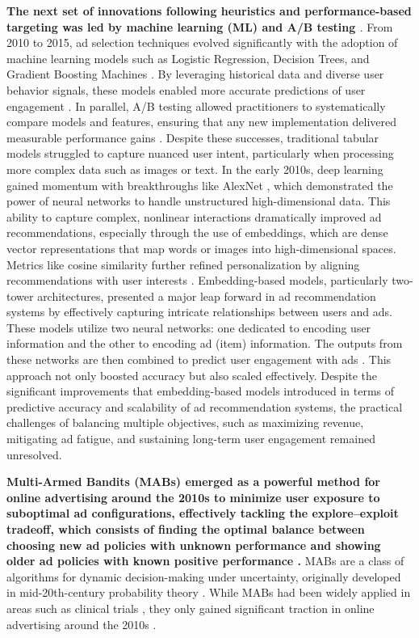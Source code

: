 \documentclass[final]{anthology-ch}         %
\begin{document}
\textbf{The next set of innovations following heuristics and performance-based targeting was led by machine learning (ML) and A/B testing \cite{barajas2022online}}. From 2010 to 2015, ad selection techniques evolved significantly with the adoption of machine learning models such as Logistic Regression, Decision Trees, and Gradient Boosting Machines \cite{cui2015global}. By leveraging historical data and diverse user behavior signals, these models enabled more accurate predictions of user engagement \cite{cui2015global}. In parallel, A/B testing allowed practitioners to systematically compare models and features, ensuring that any new implementation delivered measurable performance gains \cite{barajas2022online}.
Despite these successes, traditional tabular models struggled to capture nuanced user intent, particularly when processing more complex data such as images or text. In the early 2010s, deep learning gained momentum with breakthroughs like AlexNet \cite{krizhevsky2012imagenet}, which demonstrated the power of neural networks to handle unstructured high-dimensional data. This ability to capture complex, nonlinear interactions dramatically improved ad recommendations, especially through the use of embeddings, which are dense vector representations that map words or images into high-dimensional spaces. Metrics like cosine similarity further refined personalization by aligning recommendations with user interests \cite{covington2016deep}. Embedding-based models, particularly two-tower architectures, presented a major leap forward in ad recommendation systems by effectively capturing intricate relationships between users and ads. These models utilize two neural networks: one dedicated to encoding user information and the other to encoding ad (item) information. The outputs from these networks are then combined to predict user engagement with ads \cite{vorotilov2023scaling}. This approach not only boosted accuracy but also scaled effectively. Despite the significant improvements that embedding-based models introduced in terms of predictive accuracy and scalability of ad recommendation systems, the practical challenges of balancing multiple objectives, such as maximizing revenue, mitigating ad fatigue, and sustaining long-term user engagement remained unresolved.  


\textbf{Multi-Armed Bandits (MABs) emerged as a powerful method for online advertising around the 2010s to minimize user exposure to suboptimal ad configurations, effectively tackling the explore–exploit tradeoff, which consists of finding the optimal balance between choosing new ad policies with unknown performance and showing older ad policies with known positive performance \cite{schwartz2017customer} \cite{burtini2015improving}.} MABs are a class of algorithms for dynamic decision-making under uncertainty, originally developed in mid-20th-century probability theory \cite{robbins1952sequential}. While MABs had been widely applied in areas such as clinical trials \cite{villar2015multi} \cite{thompson1933likelihood}, they only gained significant traction in online advertising around the 2010s \cite{schwartz2017customer}.  
\end{document}
